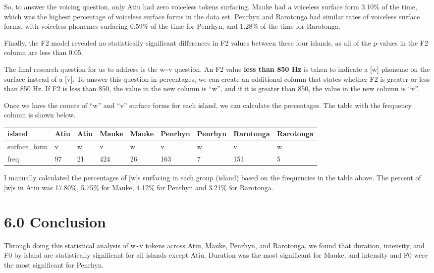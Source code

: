 \documentclass[
  ,man,floatsintext]{apa6}
\begin{document}
So, to answer the voicing question, only Atiu had zero voiceless tokens surfacing. Mauke had a voiceless surface form 3.10\% of the time, which was the highest percentage of voiceless surface forms in the data set. Penrhyn and Rarotonga had similar rates of voiceless surface forms, with voiceless phonemes surfacing 0.59\% of the time for Penrhyn, and 1.28\% of the time for Rarotonga.

Finally, the F2 model revealed no statistically significant differences in F2 values between these four islands, as all of the p-values in the F2 column are less than 0.05.

The final research question for us to address is the w\textasciitilde v question. An F2 value \textbf{less than 850 Hz} is taken to indicate a {[}w{]} phoneme on the surface instead of a {[}v{]}. To answer this question in percentages, we can create an additional column that states whether F2 is greater or less than 850 Hz. If F2 is less than 850, the value in the new column is ``w'', and if it is greater than 850, the value in the new column is ``v''.

Once we have the counts of ``w'' and ``v'' surface forms for each island, we can calculate the percentages. The table with the frequency column is shown below.

\begin{tabular}{l|l|l|l|l|l|l|l|l}
\hline
island & Atiu & Atiu & Mauke & Mauke & Penrhyn & Penrhyn & Rarotonga & Rarotonga\\
\hline
surface\_form & v & w & v & w & v & w & v & w\\
\hline
freq & 97 & 21 & 424 & 26 & 163 & 7 & 151 & 5\\
\hline
\end{tabular}

I manually calculated the percentages of {[}w{]}s surfacing in each group (island) based on the frequencies in the table above. The percent of {[}w{]}s in Atiu was 17.80\%, 5.75\% for Mauke, 4.12\% for Penrhyn and 3.21\% for Rarotonga.

\section{6.0 Conclusion}\label{conclusion}

Through doing this statistical analysis of w\textasciitilde v tokens across Atiu, Mauke, Penrhyn, and Rarotonga, we found that duration, intensity, and F0 by island are statistically significant for all islands except Atiu. Duration was the most significant for Mauke, and intensity and F0 were the most significant for Penrhyn.
\end{document}
